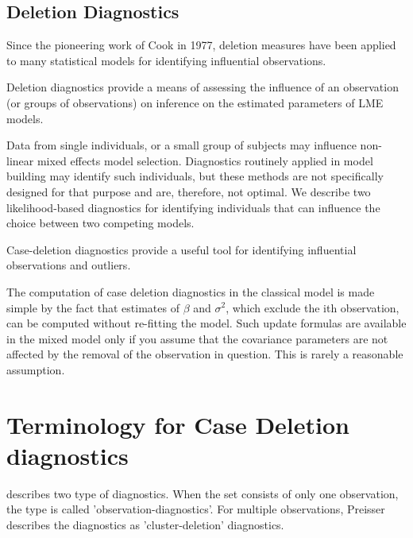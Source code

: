 \documentclass[MAIN.tex]{subfiles}
\begin{document}
	
	
	\subsection{Deletion Diagnostics}
	
	Since the pioneering work of Cook in 1977, deletion measures have been applied to many statistical models for identifying influential observations.
	
	Deletion diagnostics provide a means of assessing the influence of an observation (or groups of observations) on inference on the estimated parameters of LME models.
	
	Data from single individuals, or a small group of subjects may influence non-linear mixed effects model selection. Diagnostics routinely applied in model building may identify such individuals, but these methods are not specifically designed for that purpose and are, therefore, not optimal. We describe two likelihood-based diagnostics for identifying individuals that can influence the choice between two competing models.
	
	Case-deletion diagnostics provide a useful tool for identifying influential observations and outliers.
	
	The computation of case deletion diagnostics in the classical model is made simple by the fact that estimates of $\beta$ and $\sigma^2$, which exclude the ith observation, can be computed without re-fitting the model. Such update formulas are available in the mixed model only if you assume that the covariance parameters are not affected by the removal of the observation in question. This is rarely a reasonable assumption.
	
	\section{Terminology for Case Deletion diagnostics} %
	
	\citet{preisser} describes two type of diagnostics. When the set consists of only one observation, the type is called
	'observation-diagnostics'. For multiple observations, Preisser describes the diagnostics as 'cluster-deletion' diagnostics.
	
	



\end{document}

